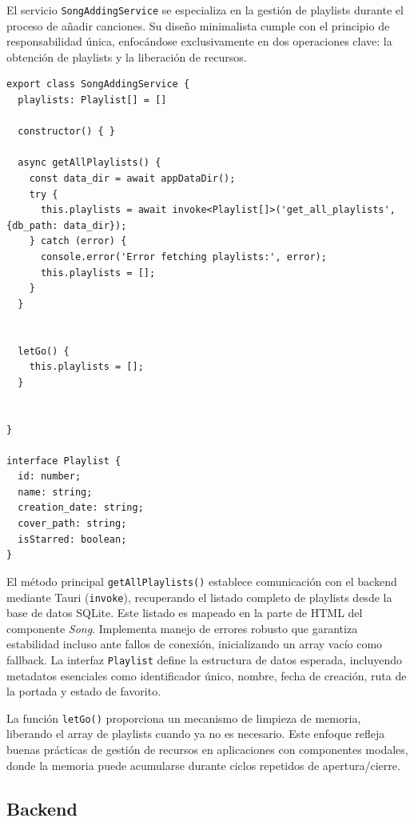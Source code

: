 \documentclass[11pt, a4paper]{article}
\begin{document}
                El servicio \texttt{SongAddingService} se especializa en la gestión de playlists durante el proceso de añadir canciones. Su diseño minimalista cumple con el principio de responsabilidad única, enfocándose exclusivamente en dos operaciones clave: la obtención de playlists y la liberación de recursos. \\

                \begin{lstlisting}[caption={song-adding.service.ts}]
export class SongAddingService {
  playlists: Playlist[] = []

  constructor() { }

  async getAllPlaylists() {
    const data_dir = await appDataDir();
    try {
      this.playlists = await invoke<Playlist[]>('get_all_playlists', {db_path: data_dir});
    } catch (error) {
      console.error('Error fetching playlists:', error);
      this.playlists = [];
    }
  }


  letGo() {
    this.playlists = [];
  }


}

interface Playlist {
  id: number;
  name: string;
  creation_date: string;
  cover_path: string;
  isStarred: boolean;
}
                \end{lstlisting}

                El método principal \texttt{getAllPlaylists()} establece comunicación con el backend mediante Tauri (\texttt{invoke}), recuperando el listado completo de playlists desde la base de datos SQLite. Este listado es mapeado en la parte de HTML del componente \textit{Song}. Implementa manejo de errores robusto que garantiza estabilidad incluso ante fallos de conexión, inicializando un array vacío como fallback. La interfaz \texttt{Playlist} define la estructura de datos esperada, incluyendo metadatos esenciales como identificador único, nombre, fecha de creación, ruta de la portada y estado de favorito.

                La función \texttt{letGo()} proporciona un mecanismo de limpieza de memoria, liberando el array de playlists cuando ya no es necesario. Este enfoque refleja buenas prácticas de gestión de recursos en aplicaciones con componentes modales, donde la memoria puede acumularse durante ciclos repetidos de apertura/cierre.

        \subsection{Backend}
\end{document}
